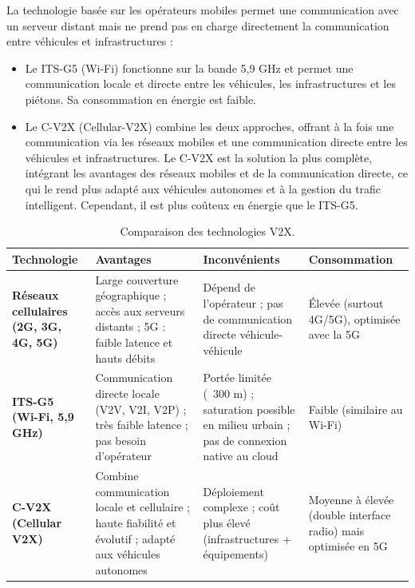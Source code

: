 La technologie basée sur les opérateurs mobiles permet une communication avec un serveur distant mais ne prend pas en charge directement la communication entre véhicules et infrastructures : 
\begin{itemize}
    \item Le ITS-G5 (Wi-Fi) fonctionne sur la bande 5,9 GHz et permet une communication locale et directe entre les véhicules, les infrastructures et les piétons. Sa consommation en énergie est faible.
    \item Le C-V2X (Cellular-V2X) combine les deux approches, offrant à la fois une communication via les réseaux mobiles et une communication directe entre les véhicules et infrastructures. Le C-V2X est la solution la plus complète, intégrant les avantages des réseaux mobiles et de la communication directe, ce qui le rend plus adapté aux véhicules autonomes et à la gestion du trafic intelligent. Cependant, il est plus coûteux en énergie que le ITS-G5.
\end{itemize}

\begin{table}[H]
\centering
\begin{tabular}{|p{3cm}|p{4cm}|p{4cm}|p{3cm}|}
\hline
\textbf{Technologie} & \textbf{Avantages} & \textbf{Inconvénients} & \textbf{Consommation} \\
\hline
\textbf{Réseaux cellulaires (2G, 3G, 4G, 5G)} 
& Large couverture géographique ; accès aux serveurs distants ; 5G : faible latence et hauts débits 
& Dépend de l’opérateur ; pas de communication directe véhicule-véhicule 
& Élevée (surtout 4G/5G), optimisée avec la 5G \\
\hline
\textbf{ITS-G5 (Wi-Fi, 5,9 GHz)} 
& Communication directe locale (V2V, V2I, V2P) ; très faible latence ; pas besoin d’opérateur 
& Portée limitée (~300 m) ; saturation possible en milieu urbain ; pas de connexion native au cloud 
& Faible (similaire au Wi-Fi) \\
\hline
\textbf{C-V2X (Cellular V2X)} 
& Combine communication locale et cellulaire ; haute fiabilité et évolutif ; adapté aux véhicules autonomes 
& Déploiement complexe ; coût plus élevé (infrastructures + équipements) 
& Moyenne à élevée (double interface radio) mais optimisée en 5G \\
\hline
\end{tabular}
\caption{Comparaison des technologies V2X.}
\end{table}

